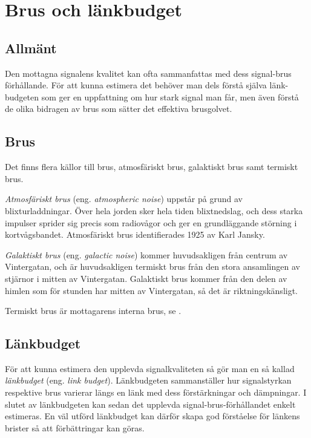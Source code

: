 \newpage
\section{Brus och länkbudget}

\subsection{Allmänt}

Den mottagna signalens kvalitet kan ofta sammanfattas med dess signal-brus
förhållande.
För att kunna estimera det behöver man dels förstå själva länk-budgeten som
ger en uppfattning om hur stark signal man får, men även förstå de olika
bidragen av brus som sätter det effektiva brusgolvet.

\subsection{Brus}

Det finns flera källor till brus, atmosfäriskt brus, galaktiskt brus samt
termiskt brus.

\emph{Atmosfäriskt brus} (eng. \emph{atmospheric noise}) uppstår på grund av
blixturladdningar.
Över hela jorden sker hela tiden blixtnedslag, och dess starka impulser sprider
sig precis som radiovågor och ger en grundläggande störning i kortvågsbandet.
Atmosfäriskt brus identifierades 1925 av Karl Jansky.

\emph{Galaktiskt brus} (eng. \emph{galactic noise}) kommer huvudsakligen från
centrum av Vintergatan, och är huvudsakligen termiskt brus från den stora
ansamlingen av stjärnor i mitten av Vintergatan.
Galaktiskt brus kommer från den delen av himlen som för stunden har mitten av
Vintergatan, så det är riktningskänsligt.

Termiskt brus är mottagarens interna brus, se .

\subsection{Länkbudget}

För att kunna estimera den upplevda signalkvaliteten så gör man en så kallad
\emph{länkbudget} (eng. \emph{link budget}).
Länkbudgeten sammanställer hur signalstyrkan respektive brus varierar längs en
länk med dess förstärkningar och dämpningar.
I slutet av länkbudgeten kan sedan det upplevda signal-brus-förhållandet
enkelt estimeras.
En väl utförd länkbudget kan därför skapa god förståelse för länkens brister
så att förbättringar kan göras.

